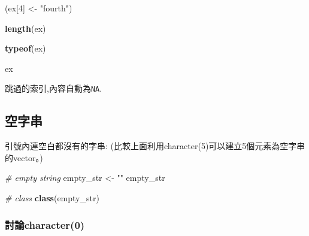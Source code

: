 \documentclass[]{book}
\newenvironment{Shaded}{\begin{snugshade}}{\end{snugshade}}
\newcommand{\CommentTok}[1]{\textcolor[rgb]{0.56,0.35,0.01}{\textit{#1}}}
\newcommand{\DecValTok}[1]{\textcolor[rgb]{0.00,0.00,0.81}{#1}}
\newcommand{\KeywordTok}[1]{\textcolor[rgb]{0.13,0.29,0.53}{\textbf{#1}}}
\newcommand{\NormalTok}[1]{#1}
\newcommand{\StringTok}[1]{\textcolor[rgb]{0.31,0.60,0.02}{#1}}
\theoremstyle{definition}
\theoremstyle{definition}
\theoremstyle{definition}
\theoremstyle{remark}
\begin{document}
\begin{Shaded}
\begin{Highlighting}[]
\NormalTok{(ex[}\DecValTok{4}\NormalTok{] <-}\StringTok{ "fourth"}\NormalTok{)}
\end{Highlighting}
\end{Shaded}

\begin{Shaded}
\begin{Highlighting}[]
\KeywordTok{length}\NormalTok{(ex)}
\end{Highlighting}
\end{Shaded}

\begin{Shaded}
\begin{Highlighting}[]
\KeywordTok{typeof}\NormalTok{(ex)}
\end{Highlighting}
\end{Shaded}

\begin{Shaded}
\begin{Highlighting}[]
\NormalTok{ex}
\end{Highlighting}
\end{Shaded}

跳過的索引,內容自動為\texttt{NA}.

\subsection{空字串}

引號內連空白都沒有的字串:
(比較上面利用character(5)可以建立5個元素為空字串的vector。)

\begin{Shaded}
\begin{Highlighting}[]
\CommentTok{# empty string}
\NormalTok{empty_str <-}\StringTok{ ""}
\NormalTok{empty_str}
\end{Highlighting}
\end{Shaded}

\begin{Shaded}
\begin{Highlighting}[]
\CommentTok{# class}
\KeywordTok{class}\NormalTok{(empty_str)}
\end{Highlighting}
\end{Shaded}

\hypertarget{character0}{%
\subsubsection{討論character(0)}\label{character0}}
\end{document}

